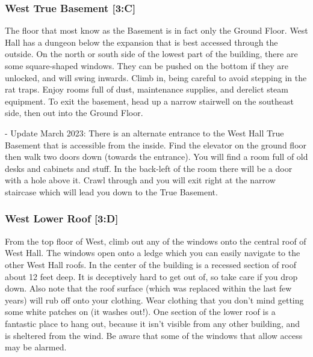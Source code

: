 \documentclass{article}
\begin{document}
\subsubsection{West True Basement [3:C]}
The floor that most know as the Basement is in fact only the Ground Floor. West Hall has a dungeon below the expansion that is best accessed through the outside. On the north or south side of the lowest part of the building, there are some square-shaped windows. They can be pushed on the bottom if they are unlocked, and will swing inwards. Climb in, being careful to avoid stepping in the rat traps. Enjoy rooms full of dust, maintenance supplies, and derelict steam equipment. To exit the basement, head up a narrow stairwell on the southeast side, then out into the Ground Floor.

- Update March 2023: There is an alternate entrance to the West Hall True Basement that is accessible from the inside. Find the elevator on the ground floor then walk two doors down (towards the entrance). You will find a room full of old desks and cabinets and stuff. In the back-left of the room there will be a door with a hole above it. Crawl through and you will exit right at the narrow staircase which will lead you down to the True Basement.

\subsubsection{West Lower Roof [3:D]}
From the top floor of West, climb out any of the windows onto the central roof of West Hall. The windows open onto a ledge which you can easily navigate to the other West Hall roofs. In the center of the building is a recessed section of roof about 12 feet deep. It is deceptively hard to get out of, so take care if you drop down. Also note that the roof surface (which was replaced within the last few years) will rub off onto your clothing. Wear clothing that you don’t mind getting some white patches on (it washes out!). One section of the lower roof is a fantastic place to hang out, because it isn’t visible from any other building, and is sheltered from the wind. Be aware that some of the windows that allow access may be alarmed.
\end{document}
